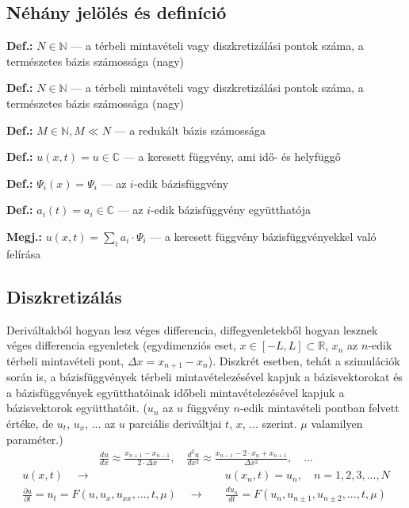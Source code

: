         \subsection*{Néhány jelölés és definíció}
            \textbf{Def.:} $N \in \mathbb{N}$ --- a térbeli mintavételi vagy diszkretizálási pontok száma, a természetes bázis számossága (nagy) \par
            \textbf{Def.:} $N \in \mathbb{N}$ --- a térbeli mintavételi vagy diszkretizálási pontok száma, a természetes bázis számossága (nagy) \par
            \textbf{Def.:} $M \in \mathbb{N}, M \ll N$ --- a redukált bázis számossága \par
            \textbf{Def.:} $u(x,t) = u \in \mathbb{C}$ --- a keresett függvény, ami idő- és helyfüggő \par
            \textbf{Def.:} $\varPsi_i(x) = \varPsi_i$ --- az $i$-edik bázisfüggvény \par
            \textbf{Def.:} $a_i(t) = a_i \in \mathbb{C}$ --- az $i$-edik bázisfüggvény együtthatója\par
            \textbf{Megj.:} $u(x,t) = \displaystyle\sum_{i} a_i \cdot \varPsi_i$ --- a keresett függvény bázisfüggvényekkel való felírása \par
        \subsection*{Diszkretizálás}
            Deriváltakból hogyan lesz véges differencia, diffegyenletekből hogyan lesznek véges differencia egyenletek (egydimenziós eset, $x \in [-L, L] \subset \mathbb{R}$, $x_n$ az $n$-edik térbeli mintavételi pont, $\Delta x = x_{n+1} - x_n$). Diszkrét esetben, tehát a szimulációk során is, a bázisfüggvények térbeli mintavételezésével kapjuk a bázisvektorokat és a bázisfüggvények együtthatóinak időbeli mintavételezésével kapjuk a bázisvektorok együtthatóit. ($u_n$ az $u$ függvény $n$-edik mintavételi pontban felvett értéke, de $u_t$, $u_x$, ... az $u$ parciális deriváltjai $t$, $x$, ... szerint. $\mu$ valamilyen paraméter.) \\
            \begin{align*}
                \frac{d u}{d x} \approx \frac{x_{n+1}-x_{n-1}}{2\cdot \Delta x}, \quad
                \frac{d^2 u}{d x^2} \approx \frac{x_{n-1}-2\cdot x_{n}+x_{n+1}}{\Delta x^2}, \quad \dots
            \end{align*}
            \begin{align*}
                u(x,t) \quad \longrightarrow & \quad u(x_n,t) = u_n, \quad n = 1,2,3,...,N \\
                \frac{\partial u}{\partial t} = u_t = F(u,u_x,u_{xx},...,t,\mu) \quad \longrightarrow & \quad
                \frac{d u_n}{d t} = F(u_n,u_{n\pm1},u_{n\pm2},...,t,\mu)
            \end{align*}
